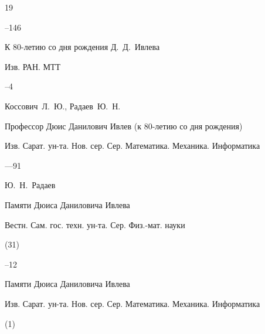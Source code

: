 \begin{thebibliography}{19}


--146





\paper К 80-летию со дня рождения Д.~Д.~Ивлева 

\jour Изв. РАН. МТТ



--4




\by Коссович~Л.~Ю., Радаев~Ю.~Н.  

\paper Профессор Дюис Данилович Ивлев (к 80-летию со дня рождения) 

\jour Изв. Сарат. ун-та. Нов. сер. Сер. Математика. Механика. Информатика




—91







\by Ю.~Н.~Радаев

\paper Памяти Дюиса Даниловича Ивлева

\serial Вестн. Сам. гос. техн. ун-та. Сер. Физ.-мат. науки


(31)

--12









\paper Памяти Дюиса Даниловича Ивлева

\jour Изв. Сарат. ун-та. Нов. сер. Сер. Математика. Механика. Информатика



(1)


\end{thebibliography}
